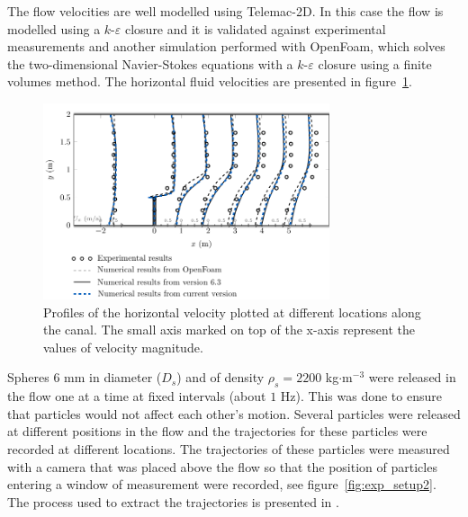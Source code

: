 The flow velocities are well modelled using Telemac-2D. In this case the flow is modelled using a $k$-$\varepsilon$
closure and it is validated against experimental measurements and another simulation performed with OpenFoam, which
solves the two-dimensional Navier-Stokes equations with a $k$-$\varepsilon$ closure using a finite volumes method.
The horizontal fluid velocities are presented in figure~\ref{fig:profil_vitesses_canal}.

\begin{figure}[H]%
\begin{center}
%
  \includegraphics[width=0.75\textwidth]{./Figures/CanalAlgFluidVelocities}
%
\end{center}
\caption{Profiles of the horizontal velocity plotted at different locations along the canal. The small axis marked on
top of the x-axis represent the values of velocity magnitude.}
\label{fig:profil_vitesses_canal}
\end{figure}

Spheres $6$ mm in diameter ($D_s$) and of density $\rho_s=2200$ kg$\cdot$m$^{-3}$ were released in the flow one at a
time at fixed intervals (about $1$ Hz). This was done to ensure that particles would not affect each other's motion.
Several particles were released at different positions in the flow and the trajectories for these particles were
recorded at different locations. The trajectories of these particles were measured with a camera that was placed above
the flow so that the position of particles entering a window of measurement were recorded, see
figure~\ref{fig:exp_setup2}. The process used to extract the trajectories is presented in \citet{Joly2011}.

